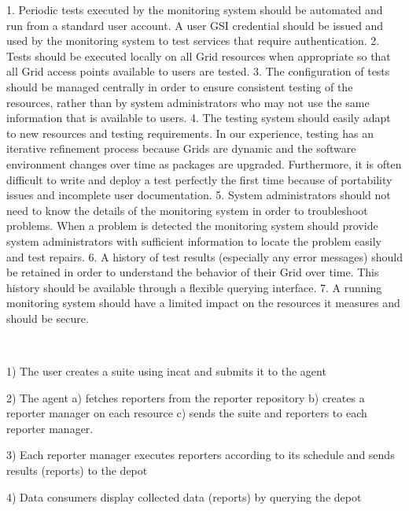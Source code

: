 \documentclass[times, 10pt,twocolumn]{article}
\begin{document}
1.  Periodic tests executed by the monitoring system should be automated and
run from a standard user account.  A user GSI credential should be issued and
used by the monitoring system to test services that require authentication.  
2.  Tests should be executed locally on all Grid resources when appropriate so
that all Grid access points available to users are tested.  
3.  The configuration of tests should be managed centrally in order to ensure
consistent testing of the resources, rather than by system administrators who
may not use the same information that is available to users.
4.  The testing system should easily adapt to new resources and testing
requirements.  In our experience, testing has an iterative refinement process
because Grids are dynamic and the software environment changes over time as
packages are upgraded.  Furthermore, it is often difficult to write and deploy
a test perfectly the first time because of portability issues and incomplete
user documentation.   
5.  System administrators should not need to know the details of the
monitoring system in order to troubleshoot problems.  When a problem is
detected the monitoring system should provide system administrators with
sufficient information to locate the problem easily and test repairs.
6.  A history of test results (especially any error messages) should be
retained in order to understand the behavior of their Grid over time. This
history should be available through a flexible querying interface.
7.  A running monitoring system should have a limited impact on the resources
it measures and should be secure.

~\newpage


1) The user creates a suite using incat and submits it to the agent

2) The agent 
    a) fetches reporters from the reporter repository
    b) creates a reporter manager on each resource
    c) sends the suite and reporters to each reporter manager.

3) Each reporter manager executes reporters according to its schedule and
sends results (reports) to the depot

4) Data consumers display collected data (reports) by querying the depot
\end{document}
